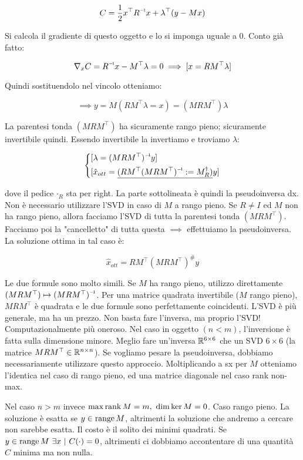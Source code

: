 \[
	C = \frac{1}{2}x^\top\inv{R}x + \lambda^\top(y-Mx)
\]

Si calcola il gradiente di questo oggetto e lo si imponga uguale a 0. Conto già fatto:

\[	
	\nabla_x{C} = \inv{R}x-M^\top\lambda = 0 \implies [x=RM^\top\lambda]
\]

Quindi sostituendolo nel vincolo otteniamo:

\[
	\implies y = M(RM^\top\lambda = x) = (MRM^\top)\lambda
\]

La parentesi tonda $(MRM^\top)$ ha sicuramente rango pieno; sicuramente invertibile quindi. Essendo invertibile la invertiamo e troviamo $\lambda$:

\[
	\left\{
	\begin{aligned}
	&[\lambda=\inv{(MRM^\top)}y]\\
	&[\hat{x}_{ott} = \underline{(RM^\top\inv{(MRM^\top)} := M^\dag_R)}y]
	\end{aligned}
	\right.
\]

dove il pedice $\mathord{\cdot}_R$ sta per right. La parte sottolineata è quindi la pseudoinversa dx. Non è necessario utilizzare l'SVD  in caso di $M$ a rango pieno. Se $R\neq I$ ed $M$ non ha rango pieno, allora facciamo l'SVD di tutta la parentesi tonda $(MRM^\top)$. Facciamo poi la "cancelletto" di tutta questa $\implies$ effettuiamo la pseudoinversa. La soluzione ottima in tal caso è:

\[
	\hat{x}_{ott} = RM^\top(MRM^\top)^\# y
\]

Le due formule sono molto simili. Se $M$ ha rango pieno, utilizzo direttamente $(MRM^\top)\mapsto\inv{(MRM^\top)}$. Per una matrice quadrata invertibile ($M$ rango pieno), $MRM^\top$ è quadrata e le due formule sono perfettamente coincidenti. L'SVD è più generale, ma ha un prezzo. Non basta fare l'inversa, ma proprio l'SVD! Computazionalmente più oneroso. Nel caso in oggetto $(n<m)$, l'inversione è fatta sulla dimensione minore. Meglio fare un'inversa $\mathbb{R}^{6\times 6}$ che un SVD $6\times 6$ (la matrice $MRM^\top\in\mathbb{R}^{n\times n}$). Se vogliamo pesare la pseudoinversa, dobbiamo necessariamente utilizzare questo approccio. Moltiplicando a sx per $M$ otteniamo l'identica nel caso di rango pieno, ed una matrice diagonale nel caso rank non-max.

Nel caso $n>m$ invece $\max\rank{M}=m,\ \dim\ker{M}=0$. Caso rango pieno. La soluzione è esatta se $y\in\operatorname{range}{M}$, altrimenti la soluzione che andremo a cercare non sarebbe esatta. Il costo è il solito dei minimi quadrati. Se $y\in\range{M}\ \exists x\ |\ C(\mathord{\cdot})=0$, altrimenti ci dobbiamo accontentare di una quantità $C$ minima ma non nulla.

